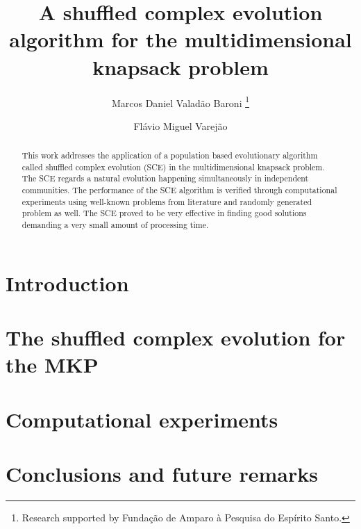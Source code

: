 \documentclass{llncs}
\begin{document}

\pagestyle{headings}  %

\title{A shuffled complex evolution algorithm for
the multidimensional knapsack problem}

\author{
   Marcos Daniel Valad\~ao Baroni
   \thanks{Research supported by Funda\c c\~ao de Amparo \`a Pesquisa do Esp\'irito Santo.}
   \and
   Fl\'avio Miguel Varej\~ao
}


\maketitle              %

\begin{abstract}
This work addresses the application of
a population based evolutionary algorithm
called shuffled complex evolution (SCE) in the multidimensional knapsack
problem.
The SCE regards a natural evolution happening simultaneously in independent communities.
The performance of the SCE algorithm is verified through computational experiments
using well-known problems from literature and randomly generated problem as well.
The SCE proved to be very effective in finding good solutions demanding a
very small amount of processing time.
\end{abstract}

\section{Introduction}
\label{sec:intro}


\section{The shuffled complex evolution for the MKP}
\label{sec:sce}


\section{Computational experiments}
\label{sec:exp}


\section{Conclusions and future remarks}
\label{sec:conc}




\end{document}
